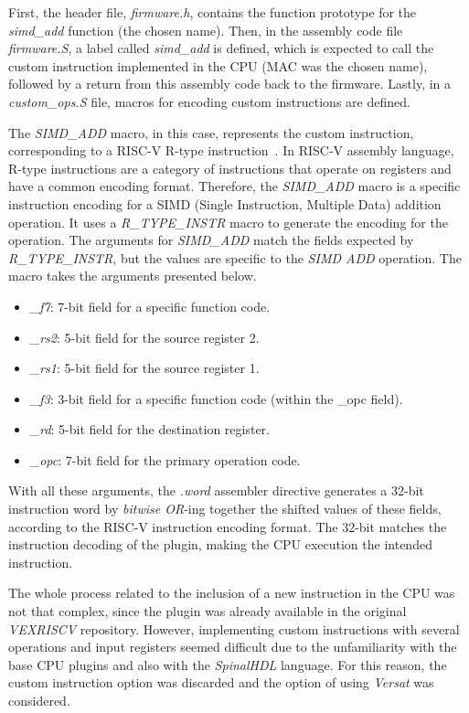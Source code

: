 First, the header file, \textit{firmware.h}, contains the function prototype for the \textit{simd\_add} function (the chosen name).
Then, in the assembly code file \textit{firmware.S}, a label called \textit{simd\_add} is defined, which is expected to call the custom instruction implemented in the CPU (MAC was the chosen name), followed by a return from this assembly code back to the firmware.
Lastly, in a \textit{custom\_ops.S} file, macros for encoding custom instructions are defined. 

The \textit{SIMD\_ADD} macro, in this case, represents the custom instruction, corresponding to a RISC-V R-type instruction~\cite{bib:riscvmanual}. In RISC-V assembly language, R-type instructions are a category of instructions that operate on registers and have a common encoding format. 
Therefore, the \textit{SIMD\_ADD} macro is a specific instruction encoding for a SIMD (Single Instruction, Multiple Data) addition operation. It uses a \textit{R\_TYPE\_INSTR} macro to generate the encoding for the operation. The arguments for \textit{SIMD\_ADD} match the fields expected by \textit{R\_TYPE\_INSTR}, but the values are specific to the \textit{SIMD ADD} operation.
The macro takes the arguments presented below.

\begin{itemize}
    \item \textit{\_f7}: 7-bit field for a specific function code.
    \item \textit{\_rs2}: 5-bit field for the source register 2.
    \item \textit{\_rs1}: 5-bit field for the source register 1.
    \item \textit{\_f3}: 3-bit field for a specific function code (within the \_opc field).
    \item \textit{\_rd}: 5-bit field for the destination register.
    \item \textit{\_opc}: 7-bit field for the primary operation code.
\end{itemize}

With all these arguments, the \textit{.word} assembler directive generates a 32-bit instruction word by \textit{bitwise OR}-ing together the shifted values of these fields, according to the RISC-V instruction encoding format. The 32-bit matches the instruction decoding of the plugin, making the CPU execution the intended instruction.

The whole process related to the inclusion of a new instruction in the CPU was not that complex, since the plugin was already available in the original \textit{VEXRISCV} repository. However, implementing custom instructions with several operations and input registers seemed difficult due to the unfamiliarity with the base CPU plugins and also with the \textit{SpinalHDL} language. For this reason, the custom instruction option was discarded and the option of using \textit{Versat} was considered.

